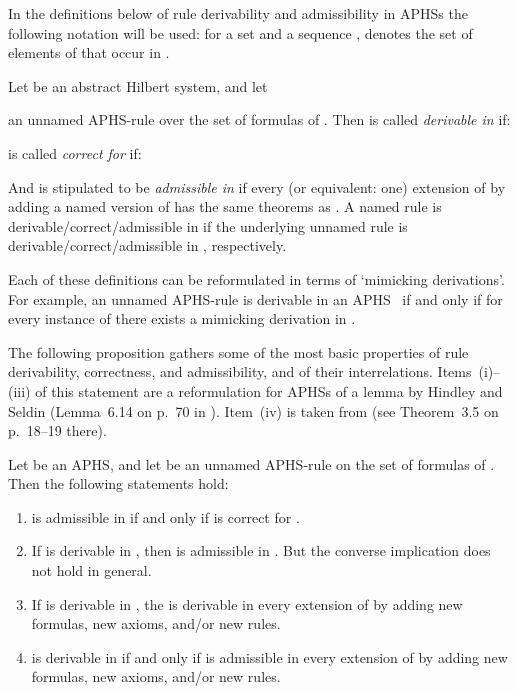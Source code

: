 \documentclass[envcountsame,runningheads]{llncs}
\newcommand{\APHS}{A\hspace*{-0.3pt}P\hspace*{-0.6pt}H\hspace*{-0.4pt}S}
\begin{document}
In the definitions below of rule derivability and admissibility in \APHS{s}
the following notation will be used:
for a set  and a sequence , 
denotes the set of elements of  that occur in .

Let  be an abstract Hilbert system,
and let

an unnamed \APHS-rule over the set of formulas of .
Then  is called \emph{derivable in } if:

 is called \emph{correct for } if: 

And  is stipulated to be \emph{admissible in } if
every (or equivalent: one)
extension  of 
by adding a named version  of 
has the same theorems as . 
A named rule  
is derivable/correct/admissible in 
if the underlying unnamed rule  
is derivable/correct/admissible in , respectively.

Each of these definitions can be reformulated in terms of `mimicking derivations'.
For example,
an unnamed \APHS-rule  is derivable in an \APHS~ 
if and only if
for every instance of  there exists a mimicking derivation
in .

The following proposition gathers some of the most basic properties of
rule derivability, correctness, and admissibility, and of their interrelations.
Items~(i)--(iii) of this statement are a reformulation for \APHS{s} of 
a lemma by Hindley and Seldin (Lemma~6.14 on p.~70 in \cite{hind:seld:1986}).
Item~(iv) is taken from \cite{grab:2003} (see Theorem~3.5 on p.~18--19 there).


\begin{proposition}
Let  be an \APHS, and let  be an unnamed \APHS-rule
  on the set of formulas of . Then the following statements hold:
\begin{enumerate}
    \renewcommand{\labelenumi}{(\roman{enumi})}
\item  is admissible in  if and only
      if  is correct for .
\item If  is derivable in , 
      then  is admissible in . But the converse
      implication does not hold in general.
\item If  is derivable in , the
       is derivable in every extension of  by
      adding new formulas, new axioms, and/or new rules. 
\item  is derivable in  if and only if
       is admissible in every extension of  by
      adding new formulas, new axioms, and/or new rules. 
\end{enumerate}
\end{proposition}
\end{document}
